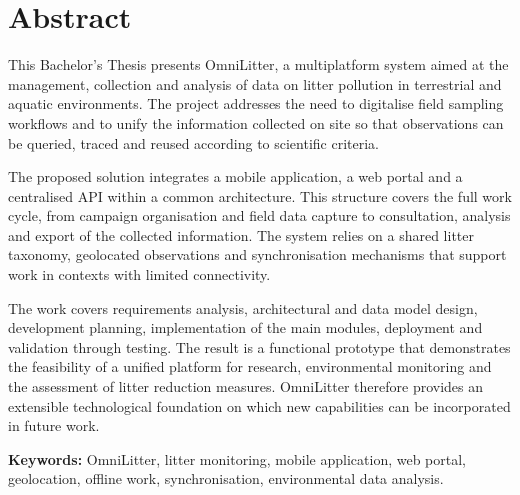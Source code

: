 \chapter*{Abstract}

This Bachelor's Thesis presents OmniLitter, a multiplatform system aimed at the
management, collection and analysis of data on litter pollution in terrestrial
and aquatic environments. The project addresses the need to digitalise field
sampling workflows and to unify the information collected on site so that
observations can be queried, traced and reused according to scientific criteria.

The proposed solution integrates a mobile application, a web portal and a
centralised API within a common architecture. This structure covers the full work
cycle, from campaign organisation and field data capture to consultation,
analysis and export of the collected information. The system relies on a shared
litter taxonomy, geolocated observations and synchronisation mechanisms that
support work in contexts with limited connectivity.

The work covers requirements analysis, architectural and data model design,
development planning, implementation of the main modules, deployment and
validation through testing. The result is a functional prototype that
demonstrates the feasibility of a unified platform for research, environmental
monitoring and the assessment of litter reduction measures. OmniLitter therefore
provides an extensible technological foundation on which new capabilities can be
incorporated in future work.

\vspace{.5cm}

\textbf{Keywords:} OmniLitter, litter monitoring, mobile application, web
portal, geolocation, offline work, synchronisation, environmental data analysis.
